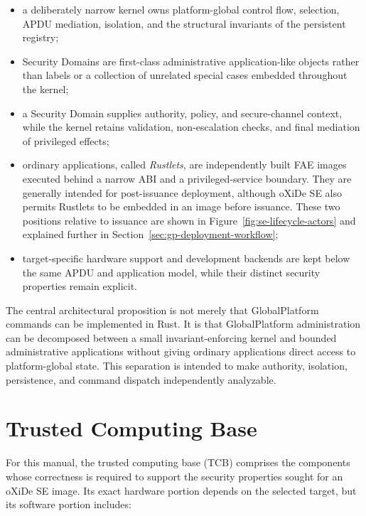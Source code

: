\begin{itemize}
\item a deliberately narrow kernel owns platform-global control flow,
  selection, APDU mediation, isolation, and the structural invariants of the
  persistent registry;
\item Security Domains are first-class administrative application-like objects
  rather than labels or a collection of unrelated special cases embedded
  throughout the kernel;
\item a Security Domain supplies authority, policy, and secure-channel context,
  while the kernel retains validation, non-escalation checks, and final
  mediation of privileged effects;
\item ordinary applications, called \emph{Rustlets}, are independently built
  FAE images executed behind a narrow ABI and a privileged-service boundary.
  They are generally intended for post-issuance deployment, although oXiDe SE
  also permits Rustlets to be embedded in an image before issuance. These two
  positions relative to issuance are shown in
  Figure~\ref{fig:se-lifecycle-actors} and explained further in
  Section~\ref{sec:gp-deployment-workflow};
\item target-specific hardware support and development backends are kept below
  the same APDU and application model, while their distinct security properties
  remain explicit.
\end{itemize}

The central architectural proposition is not merely that GlobalPlatform
commands can be implemented in Rust. It is that GlobalPlatform administration can be decomposed
between a small invariant-enforcing kernel and bounded administrative
applications without giving ordinary applications direct access to
platform-global state. This separation is intended to make authority,
isolation, persistence, and command dispatch independently analyzable.

\section{Trusted Computing Base}

For this manual, the trusted computing base (TCB) comprises the components whose
correctness is required to support the security properties sought for an
oXiDe SE image. Its exact hardware portion depends on the selected target, but
its software portion includes:

